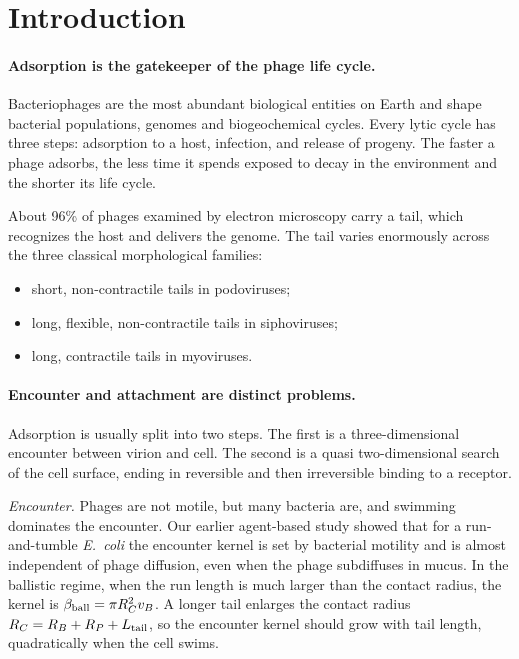 \documentclass[12pt]{article}
\begin{document}
\section*{Introduction}
\linenumbers

\paragraph{Adsorption is the gatekeeper of the phage life cycle.} Bacteriophages are the most abundant biological entities on Earth and shape bacterial populations, genomes and biogeochemical cycles. Every lytic cycle has three steps: adsorption to a host, infection, and release of progeny\cite{shao2008bacteriophage,adams1959bacteriophages}. The faster a phage adsorbs, the less time it spends exposed to decay in the environment and the shorter its life cycle\cite{murray1992viral,shao2008bacteriophage}.

About 96\% of phages examined by electron microscopy carry a tail, which recognizes the host and delivers the genome. The tail varies enormously across the three classical morphological families:
\begin{itemize}\setlength\itemsep{0pt}
\item short, non-contractile tails in podoviruses;
\item long, flexible, non-contractile tails in siphoviruses;
\item long, contractile tails in myoviruses.
\end{itemize}

\paragraph{Encounter and attachment are distinct problems.} Adsorption is usually split into two steps. The first is a three-dimensional encounter between virion and cell. The second is a quasi two-dimensional search of the cell surface, ending in reversible and then irreversible binding to a receptor\cite{schwartz1976adsorption,berg1977physics,storms2015modeling}.

\emph{Encounter.} Phages are not motile, but many bacteria are, and swimming dominates the encounter. Our earlier agent-based study showed that for a run-and-tumble \textit{E.~coli} the encounter kernel is set by bacterial motility and is almost independent of phage diffusion, even when the phage subdiffuses in mucus\cite{joiner2019impact}. In the ballistic regime, when the run length is much larger than the contact radius, the kernel is $\beta_{\rm ball}=\pi R_C^2 v_B$\cite{visser2006plankton,kiorboe2008mechanistic}. A longer tail enlarges the contact radius $R_C=R_B+R_P+L_{\rm tail}$, so the encounter kernel should grow with tail length, quadratically when the cell swims.
\end{document}
